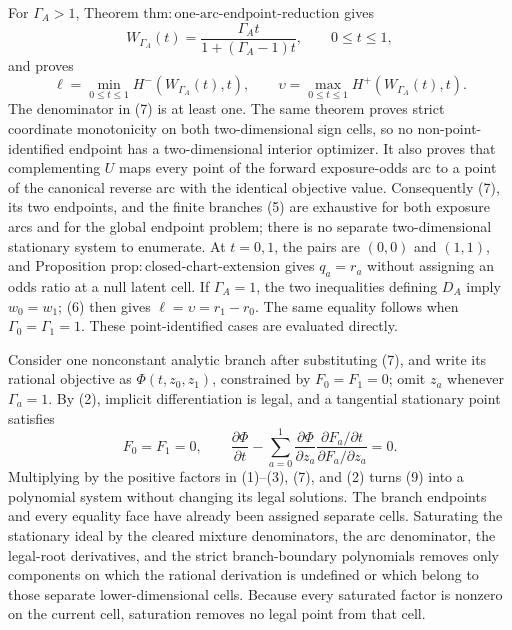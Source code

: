 For \(\Gamma_A>1\), Theorem \(\mathrm{thm{:}one\text{-}arc\text{-}endpoint\text{-}reduction}\) gives
\[
 W_{\Gamma_A}(t)=\frac{\Gamma_A t}{1+(\Gamma_A-1)t},
 \qquad 0\leq t\leq1,                                                  \tag{7}
\]
and proves
\[
 \ell=\min_{0\leq t\leq1}H^-(W_{\Gamma_A}(t),t),
 \qquad
 \upsilon=\max_{0\leq t\leq1}H^+(W_{\Gamma_A}(t),t).                 \tag{8}
\]
The denominator in (7) is at least one.  The same theorem proves strict coordinate monotonicity on both two-dimensional sign cells, so no non-point-identified endpoint has a two-dimensional interior optimizer.  It also proves that complementing \(U\) maps every point of the forward exposure-odds arc to a point of the canonical reverse arc with the identical objective value.  Consequently (7), its two endpoints, and the finite branches (5) are exhaustive for both exposure arcs and for the global endpoint problem; there is no separate two-dimensional stationary system to enumerate.  At \(t=0,1\), the pairs are \((0,0)\) and \((1,1)\), and Proposition \(\mathrm{prop{:}closed\text{-}chart\text{-}extension}\) gives \(q_a=r_a\) without assigning an odds ratio at a null latent cell.  If \(\Gamma_A=1\), the two inequalities defining \(D_A\) imply \(w_0=w_1\); (6) then gives \(\ell=\upsilon=r_1-r_0\).  The same equality follows when \(\Gamma_0=\Gamma_1=1\).  These point-identified cases are evaluated directly.

Consider one nonconstant analytic branch after substituting (7), and write its rational objective as \(\Phi(t,z_0,z_1)\), constrained by \(F_0=F_1=0\); omit \(z_a\) whenever \(\Gamma_a=1\).  By (2), implicit differentiation is legal, and a tangential stationary point satisfies
\[
 F_0=F_1=0,
 \qquad
 \frac{\partial\Phi}{\partial t}
 -\sum_{a=0}^1
   \frac{\partial\Phi}{\partial z_a}
   \frac{\partial F_a/\partial t}{\partial F_a/\partial z_a}=0.        \tag{9}
\]
Multiplying by the positive factors in (1)--(3), (7), and (2) turns (9) into a polynomial system without changing its legal solutions.  The branch endpoints and every equality face have already been assigned separate cells.  Saturating the stationary ideal by the cleared mixture denominators, the arc denominator, the legal-root derivatives, and the strict branch-boundary polynomials removes only components on which the rational derivation is undefined or which belong to those separate lower-dimensional cells.  Because every saturated factor is nonzero on the current cell, saturation removes no legal point from that cell.

